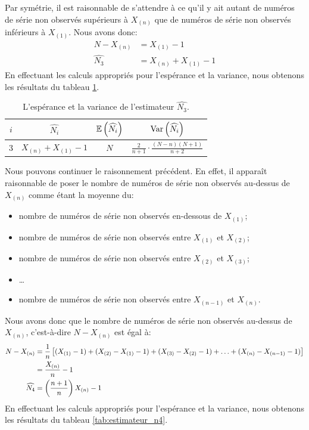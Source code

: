 \documentclass[10pt]{article}
\begin{document}
Par symétrie, il est raisonnable de s'attendre à ce qu'il y ait autant
de numéros de série non observés supérieurs à \(X_{(n)}\) que de numéros
de série non observés inférieurs à \(X_{(1)}\). Nous avons donc:
\begin{align*}
N-X_{(n)} &= X_{(1)}-1 \\
\widehat{N_3} &= X_{(n)}+X_{(1)}-1
\end{align*} En effectuant les calculs appropriés pour l'espérance et la
variance, nous obtenons les résultats du tableau
\ref{tab:estimateur_n3}.

\begin{table}[ht]
\begin{center}
\begin{tabular}{|c|c|c|c|}
\hline
$i$ & $\widehat{N_i}$ & $\operatorname{\mathbb{E}}\left(\widehat{N_i}\right)$ & $\operatorname{Var}\left(\widehat{N_i}\right)$ \\
\hline
\hline
3 & $X_{(n)}+X_{(1)}-1$ & $N$ & $\frac{2}{n+1}\cdot\frac{(N-n)(N+1)}{n+2}$ \\
\hline
\end{tabular}
\end{center}
\caption{\label{tab:estimateur_n3} {L'espérance et la variance de l'estimateur $\widehat{N_3}$.} }
\end{table}

Nous pouvons continuer le raisonnement précédent. En effet, il apparaît
raisonnable de poser le nombre de numéros de série non observés
au-dessus de \(X_{(n)}\) comme étant la moyenne du:

\begin{itemize}
\item
  nombre de numéros de série non observés en-dessous de \(X_{(1)}\);
\item
  nombre de numéros de série non observés entre \(X_{(1)}\) et
  \(X_{(2)}\);
\item
  nombre de numéros de série non observés entre \(X_{(2)}\) et
  \(X_{(3)}\);
\item
  \ldots{}
\item
  nombre de numéros de série non observés entre \(X_{(n-1)}\) et
  \(X_{(n)}\).
\end{itemize}

Nous avons donc que le nombre de numéros de série non observés au-dessus
de \(X_{(n)}\), c'est-à-dire \(N-X_{(n)}\) est égal à: \begin{align*}
N-X_{(n)} &= \frac{1}{n}\left[ (X_{(1)}-1)+(X_{(2)}-X_{(1)}-1)+(X_{(3)}-X_{(2)}-1)+\ldots+(X_{(n)}-X_{(n-1)}-1) \right] \\
&= \frac{X_{(n)}}{n}-1 \\
\widehat{N_4} &= \left(\frac{n+1}{n}\right) X_{(n)}-1
\end{align*} En effectuant les calculs appropriés pour l'espérance et la
variance, nous obtenons les résultats du tableau
\ref{tab:estimateur_n4}.
\end{document}
